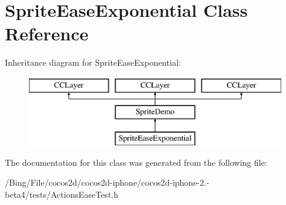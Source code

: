 \hypertarget{interface_sprite_ease_exponential}{\section{Sprite\-Ease\-Exponential Class Reference}
\label{interface_sprite_ease_exponential}
}
Inheritance diagram for Sprite\-Ease\-Exponential\-:\begin{figure}[H]
\begin{center}
\leavevmode
\includegraphics[height=3.000000cm]{interface_sprite_ease_exponential}
\end{center}
\end{figure}


The documentation for this class was generated from the following file\-:\begin{DoxyCompactItemize}
\item 
/\-Bing/\-File/cocos2d/cocos2d-\/iphone/cocos2d-\/iphone-\/2.-\/beta4/tests/Actions\-Ease\-Test.\-h\end{DoxyCompactItemize}

